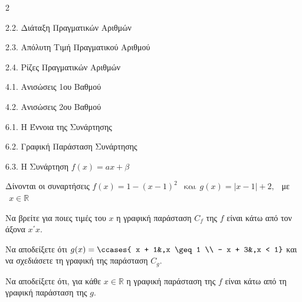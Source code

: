 \begin{ylh}{2}
    \item 2.2. Διάταξη Πραγματικών Αριθμών
    \item 2.3. Απόλυτη Τιμή Πραγματικού Αριθμού
    \item 2.4. Ρίζες Πραγματικών Αριθμών
    \item 4.1. Ανισώσεις 1ου Βαθμού
    \item 4.2. Ανισώσεις 2ου Βαθμού
    \item 6.1. Η Έννοια της Συνάρτησης
    \item 6.2. Γραφική Παράσταση Συνάρτησης
    \item 6.3. Η Συνάρτηση $f(x)=ax+\beta$
\end{ylh}
Δίνονται οι συναρτήσεις $f(x) = 1 - (x - 1)^{2}\ \ \text{ και}\ \ g(x) = |x - 1| + 2,\ \ $ με $\ \ x \in \mathbb{R}$

\begin{alist}
\item Να βρείτε για ποιες τιμές του $x$ η γραφική παράσταση $C_{f}$ της $f$ είναι κάτω από τον άξονα $x΄x$.
\item Να αποδείξετε ότι \(g(x) = \ccases{
 x + 1&,x \geq 1 \\
 - x + 3&,x < 1} \) και να σχεδιάσετε τη γραφική της παράσταση $C_{g}$.

\item Να αποδείξετε ότι, για κάθε $x \in \mathbb{R}$ η γραφική παράσταση της $f$ είναι κάτω από τη γραφική παράσταση της $g$.
\end{alist}

